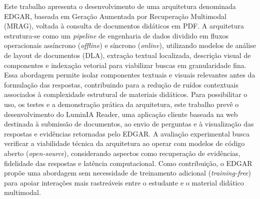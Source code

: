 Este trabalho apresenta o desenvolvimento de uma arquitetura denominada EDGAR, baseada em Geração Aumentada por Recuperação Multimodal (MRAG), voltada à consulta de documentos didáticos em PDF. A arquitetura estrutura-se como um \textit{pipeline} de engenharia de dados dividido em fluxos operacionais assíncrono (\textit{offline}) e síncrono (\textit{online}), utilizando modelos de análise de layout de documentos (DLA), extração textual localizada, descrição visual de componentes e indexação vetorial para viabilizar buscas em granularidade fina. Essa abordagem permite isolar componentes textuais e visuais relevantes antes da formulação das respostas, contribuindo para a redução de ruídos contextuais associados à complexidade estrutural de materiais didáticos. Para possibilitar o uso, os testes e a demonstração prática da arquitetura, este trabalho prevê o desenvolvimento do LuminIA Reader, uma aplicação cliente baseada na web destinada à submissão de documentos, ao envio de perguntas e à visualização das respostas e evidências retornadas pelo EDGAR. A avaliação experimental busca verificar a viabilidade técnica da arquitetura ao operar com modelos de código aberto (\textit{open-source}), considerando aspectos como recuperação de evidências, fidelidade das respostas e latência computacional. Como contribuição, o EDGAR propõe uma abordagem sem necessidade de treinamento adicional (\textit{training-free}) para apoiar interações mais rastreáveis entre o estudante e o material didático multimodal.

